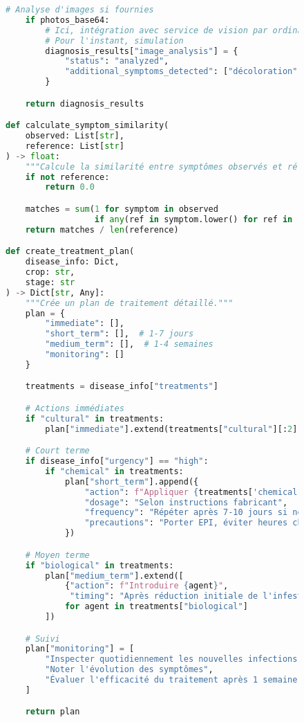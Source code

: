 \begin{figure}[H]
\begin{lstlisting}[language=Python, caption=Implémentation d'outils spécialisés pour l'agriculture]
    # Analyse d'images si fournies
    if photos_base64:
        # Ici, intégration avec service de vision par ordinateur
        # Pour l'instant, simulation
        diagnosis_results["image_analysis"] = {
            "status": "analyzed",
            "additional_symptoms_detected": ["décoloration", "nécrose"]
        }

    return diagnosis_results

def calculate_symptom_similarity(
    observed: List[str],
    reference: List[str]
) -> float:
    """Calcule la similarité entre symptômes observés et référence."""
    if not reference:
        return 0.0

    matches = sum(1 for symptom in observed
                  if any(ref in symptom.lower() for ref in reference))
    return matches / len(reference)

def create_treatment_plan(
    disease_info: Dict,
    crop: str,
    stage: str
) -> Dict[str, Any]:
    """Crée un plan de traitement détaillé."""
    plan = {
        "immediate": [],
        "short_term": [],  # 1-7 jours
        "medium_term": [],  # 1-4 semaines
        "monitoring": []
    }

    treatments = disease_info["treatments"]

    # Actions immédiates
    if "cultural" in treatments:
        plan["immediate"].extend(treatments["cultural"][:2])

    # Court terme
    if disease_info["urgency"] == "high":
        if "chemical" in treatments:
            plan["short_term"].append({
                "action": f"Appliquer {treatments['chemical'][0]}",
                "dosage": "Selon instructions fabricant",
                "frequency": "Répéter après 7-10 jours si nécessaire",
                "precautions": "Porter EPI, éviter heures chaudes"
            })

    # Moyen terme
    if "biological" in treatments:
        plan["medium_term"].extend([
            {"action": f"Introduire {agent}",
             "timing": "Après réduction initiale de l'infestation"}
            for agent in treatments["biological"]
        ])

    # Suivi
    plan["monitoring"] = [
        "Inspecter quotidiennement les nouvelles infections",
        "Noter l'évolution des symptômes",
        "Évaluer l'efficacité du traitement après 1 semaine"
    ]

    return plan
\end{lstlisting}
\end{figure}

